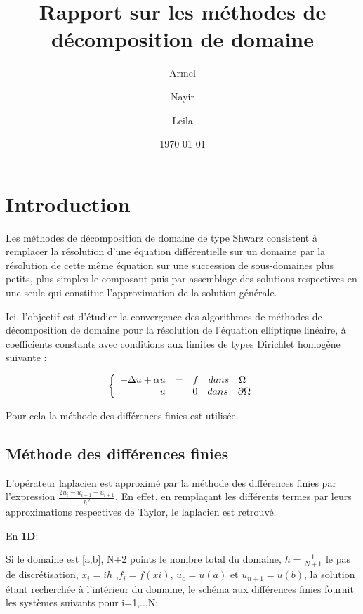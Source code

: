 \documentclass[a4paper,12pt,twoside]{report}
\title{Rapport sur les méthodes de décomposition de domaine }
\author{
 Armel
  \and
Nayir \and Leila
}
\date{\today} %
\begin{document}
\maketitle %

\cleardoublepage
\tableofcontents %

\cleardoublepage
\chapter{Introduction }
Les méthodes de décomposition de domaine de type Shwarz consistent à remplacer la résolution d'une équation différentielle sur un domaine par la résolution de cette même équation sur une succession de sous-domaines plus petits, plus simples le composant puis par assemblage des solutions respectives en une seule qui constitue l'approximation de la solution générale.

Ici, l'objectif est d'étudier la convergence des algorithmes de méthodes de décomposition de domaine pour la résolution de l'équation elliptique linéaire, à coefficients constants avec conditions aux limites de types Dirichlet homogène suivante :

\[
\left\{
\begin{array}{r c l}
 -\Delta u + \alpha u   &=& f \quad dans \quad \Omega  \\
 u&=&0 \quad dans \quad \partial\Omega\\
\end{array}
\right.
\]

Pour cela la méthode des différences finies est utilisée.

\section{Méthode des différences finies
}
L'opérateur laplacien est approximé par la méthode des différences finies par l’expression $ \frac{2u_{i}-u_{i-1} -u_{i+1}}{h^{2}} $. En effet, en remplaçant les différents termes par leurs approximations respectives de Taylor, le laplacien est retrouvé.

En \textbf{\color[rgb]{0,0.13,0.75}1D}:

Si le domaine est [a,b], N+2 points le nombre total du domaine, $ h=\frac{1}{ N+1} $   le pas de discrétisation, $ x_{i}=ih$ ,$ f_{i}=f(xi)$, $u_{o}=u(a)$ et $u_{n+1}=u(b)$, la solution étant recherchée  à l'intérieur du domaine, le schéma aux différences finies fournit les systèmes suivants pour i=1,..,N:
\end{document}
